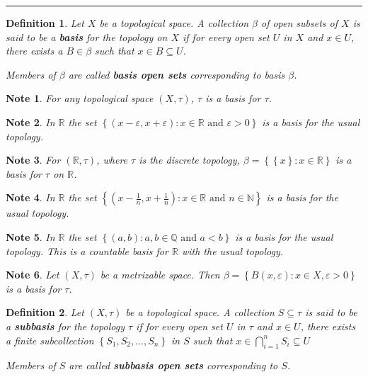 \documentclass[14pt,twoside]{extreport}
\newcommand{\hhrule}{\vspace{1cm}\hrule\vspace{1cm}}
\newtheorem*{defn}{Definition}
\newtheorem*{note}{Note}
\begin{document}
\hhrule

\begin{defn}
    Let $X$ be a topological space. A collection $\beta$ of open subsets of $X$ is said to be a \textbf{basis} for the topology on $X$ if for every open set $U$ in $X$ and $x \in U$, there exists a $B \in \beta$ such that $x \in B \subseteq U$.

    Members of $\beta$ are called \textbf{basis open sets} corresponding to basis $\beta$.
\end{defn}

\begin{note}
    For any topological space $\left (X, \tau\right )$, $\tau$ is a basis for $\tau$.
\end{note}

\begin{note}
    In $\mathbb{R}$ the set $\left\{ \left (x - \varepsilon, x + \varepsilon\right )  :  x \in \mathbb{R}\text{ and }\varepsilon >0 \right\}$ is a basis for the usual topology.
\end{note}

\begin{note}
    For $\left (\mathbb{R}, \tau\right )$, where $\tau$ is the discrete topology, $\beta = \left\{ \left\{ x \right\}  :  x \in \mathbb{R} \right\}$ is a basis for $\tau$ on $\mathbb{R}$.
\end{note}

\begin{note}
    In $\mathbb{R}$ the set $\left\{ \left (x - \frac{1}{n}, x + \frac{1}{n}\right )  :  x \in \mathbb{R}\text{ and }n \in \mathbb{N} \right\}$ is a basis for the usual topology.
\end{note}

\begin{note}
    In $\mathbb{R}$ the set $\left\{ \left (a, b\right )  :  a,b \in \mathbb{Q}\text{ and }a < b \right\}$ is a basis for the usual topology. This is a countable basis for $\mathbb{R}$ with the usual topology.
\end{note}

\begin{note}
    Let $\left (X, \tau\right )$ be a metrizable space. Then $\beta = \left\{ B\left (x, \varepsilon\right )  :  x \in X, \varepsilon >0 \right\}$ is a basis for $\tau$.
\end{note}

\begin{defn}
    Let $\left (X, \tau\right )$ be a topological space. A collection $S \subseteq \tau$ is said to be a \textbf{subbasis} for the topology $\tau$ if for every open set $U$ in $\tau$ and $x \in U$, there exists a finite subcollection $\left\{ S_1, S_2, ..., S_n \right\}$ in $S$ such that $x \in \displaystyle\bigcap_{i = 1}^n S_i \subseteq U$

    Members of $S$ are called \textbf{subbasis open sets} corresponding to $S$.
\end{defn}
\end{document}
